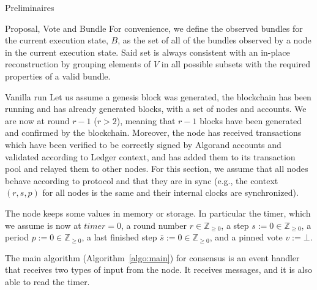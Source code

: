 \documentclass[10pt,a4paper]{article}
\begin{document}
\begin{section}{Preliminaires}
\begin{subsection}{Proposal, Vote and Bundle}
For convenience, we define the {\sf observed bundles} for the current execution state, 
$B$, as the set of all of the bundles observed by a node in the current execution state. 
Said set is always consistent with an in-place reconstruction by grouping elements of $V$ in all 
possible subsets with the required properties of a valid bundle.
\end{subsection}

\end{section}
\begin{section}{Vanilla run}\label{subsect:vanilla-run}
    Let us assume a genesis block was generated, the blockchain has been running and
    has already generated blocks, with a set of nodes and accounts. 
    We are now at round $r-1$ ($r>2$), meaning that $r-1$ blocks have been 
    generated and confirmed by the blockchain.
    Moreover, the node has received transactions which have been verified to 
    be correctly signed by Algorand accounts and validated according to Ledger context, 
    and has added them to its transaction pool and relayed them to other nodes.
    For this section, we assume that all nodes behave according to protocol
    and that they are in sync (e.g., the context $(r,s,p)$ for all nodes is 
    the same and their internal clocks are synchronized).
    
    The node keeps some values in memory or storage. In particular the 
    timer, which we assume is now at $timer=0$,
    a round number $r\in\mathbb{Z}_{\ge 0}$, 
    a step $s:=0\in\mathbb{Z}_{\ge 0}$,
    a period $p:=0\in\mathbb{Z}_{\ge 0}$, 
    a last finished step $\bar{s}:=0\in\mathbb{Z}_{\ge 0}$, and 
    a pinned vote $v:=\bot$.
    
    The main algorithm (Algorithm~\ref{algo:main}) for consensus is an event 
    handler that receives two types of input from the node. 
    It receives messages, and it is also able to read the timer.
    

\end{section}
\end{document}
